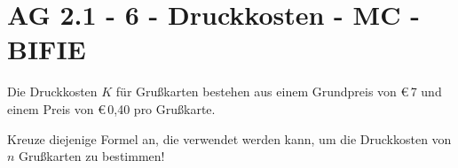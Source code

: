 \section{AG 2.1 - 6 - Druckkosten - MC - BIFIE}

\begin{beispiel}[AG 2.1]{1} %
		Die Druckkosten $K$ für Grußkarten bestehen aus einem Grundpreis von \euro\,7 und einem Preis
von \euro\,0,40 pro Grußkarte.

Kreuze diejenige Formel an, die verwendet werden kann, um die Druckkosten von $n$ Grußkarten zu bestimmen!

\end{beispiel}